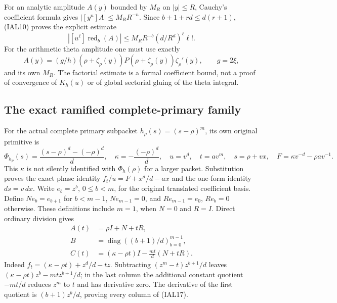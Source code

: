 \documentclass[11pt,a4paper]{article}
\theoremstyle{definition}
\begin{document}
For an analytic amplitude $A(y)$ bounded by $M_R$ on $|y|\leq R$, Cauchy's
coefficient formula gives $|[y^n]A|\leq M_R R^{-n}$.  Since
$b+1+rd\leq d(r+1)$, (IAL10) proves the explicit estimate
\begin{equation}
 |[u^\ell]\operatorname{red}_b(A)|
 \leq M_R R^{-b}(d/R^d)^\ell\ell!.                  \tag{IAL14}
\end{equation}
For the arithmetic theta amplitude one must use exactly
\begin{equation}
 A(y)=(g/h)(\rho+\zeta_\rho(y))
       P(\rho+\zeta_\rho(y))\zeta_\rho'(y),\qquad g=2\xi,
                                                        \tag{IAL15}
\end{equation}
and its own $M_R$.  The factorial estimate is a formal coefficient
bound, not a proof of convergence of $K_h(u)$ or of global sectorial
gluing of the theta integral.

\subsection{The exact ramified complete-primary family}
For the actual complete primary subpacket $h_\rho(s)=(s-\rho)^m$, its
own original primitive is
\begin{equation}
 \Phi_{h_\rho}(s)=\frac{(s-\rho)^d-(-\rho)^d}{d},
 \quad \kappa=-\frac{(-\rho)^d}{d},\quad
 u=v^d,\quad t=av^m,\quad s=\rho+vx,
 \quad F=\kappa v^{-d}-\rho a v^{-1}.                \tag{IAL16}
\end{equation}
This $\kappa$ is not silently identified with $\Phi_h(\rho)$ for a
larger packet.  Substitution proves the exact phase identity
$f_t/u=F+x^d/d-ax$ and the one-form identity $ds=v\,dx$.
Write $e_b=z^b$, $0\leq b<m$, for the original translated coefficient
basis.  Define $Ne_b=e_{b+1}$ for $b<m-1$, $Ne_{m-1}=0$, and
$Re_{m-1}=e_0$, $Re_b=0$ otherwise.  These definitions include $m=1$,
when $N=0$ and $R=I$.  Direct ordinary division gives
\begin{equation}
 \begin{aligned}
 A(t)&=\rho I+N+tR,\\
 B&=\operatorname{diag}((b+1)/d)_{b=0}^{m-1},\\
 C(t)&=(\kappa-\rho t)I-\frac{mt}{d}(N+tR).
 \end{aligned}                                      \tag{IAL17}
\end{equation}
Indeed $f_t=(\kappa-\rho t)+z^d/d-tz$.  Subtracting
$(z^m-t)z^{b+1}/d$ leaves
$(\kappa-\rho t)z^b-mt z^{b+1}/d$; in the last column the additional
constant quotient $-mt/d$ reduces $z^m$ to $t$ and has derivative zero.
The derivative of the first quotient is $(b+1)z^b/d$, proving every
column of (IAL17).
\end{document}
